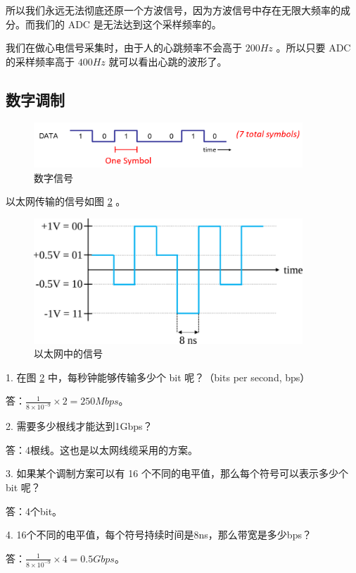 \documentclass[lang=cn,newtx,10pt,scheme=chinese]{elegantbook}
\begin{document}
\begin{marker}
    所以我们永远无法彻底还原一个方波信号，因为方波信号中存在无限大频率的成分。而我们的 ADC 是无法达到这个采样频率的。

    我们在做心电信号采集时，由于人的心跳频率不会高于 $200Hz$ 。所以只要 ADC 的采样频率高于 $400Hz$ 就可以看出心跳的波形了。
\end{marker}

\subsection{数字调制}

\begin{figure}[!htb]
\centering
\includegraphics[width=0.9\textwidth]{symbols.png}
\caption{数字信号}
\label{fig:symbols}
\end{figure}

以太网传输的信号如图 \ref{fig:ethernet} 。

\begin{figure}[!htb]
\centering
\includegraphics[width=0.9\textwidth]{ethernet.pdf}
\caption{以太网中的信号}
\label{fig:ethernet}
\end{figure}

\begin{marker}
    1. 在图 \ref{fig:ethernet} 中，每秒钟能够传输多少个 bit 呢？（bits per second, bps）
    
    答：$\frac{1}{8 \times 10^{-9}}\times 2 = 250Mbps$。

    2. 需要多少根线才能达到1Gbps？

    答：4根线。这也是以太网线缆采用的方案。

    3. 如果某个调制方案可以有 16 个不同的电平值，那么每个符号可以表示多少个 bit 呢？

    答：4个bit。

    4. 16个不同的电平值，每个符号持续时间是8ns，那么带宽是多少bps？

    答：$\frac{1}{8 \times 10^{-9}}\times 4 = 0.5Gbps$。
\end{marker}
\end{document}
